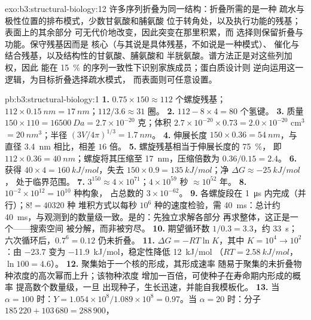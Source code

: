 \begin{solution}{exo:b3:structural-biology:12}
许多序列折叠为同一结构：折叠所需的是一种
疏水与极性位置的排布模式，少数甘氨酸和脯氨酸
位于转角处，以及执行功能的残基；表面上的其余部分
可无代价地改变，因此突变在那里积累，而
选择则保留折叠与功能。保守残基因而是
核心（与其说是具体残基，不如说是一种模式）、
催化与结合残基，以及结构性的甘氨酸、脯氨酸和
半胱氨酸。谱方法正是对这些列加权，因此
能在 \qty{15}{\%} 的序列一致性下识别家族成员；蛋白质设计则
逆向运用这一逻辑，为目标折叠选择疏水模式，
而表面则可任意设置。
\end{solution}

\begin{solution}{pb:b3:structural-biology:1}
\textbf{1.} $0.75\times 150 \approx 112$ 个螺旋残基；$112\times
\qty{0.15}{nm} = \qty{17}{nm}$；$112/3.6 \approx 31$ 圈。
\textbf{2.} $112 - 8\times 4 = 80$ 个氢键。
\textbf{3.} 质量 $150\times 110 = \qty{16500}{Da} = 2.7\times 10^{-20}$
克；体积 $2.7\times 10^{-20}\times 0.73 = 2.0\times 10^{-20}$ cm$^{3}$
$= \qty{20}{nm^3}$；半径 $(3V/4\pi)^{1/3} = \qty{1.7}{nm}$。
\textbf{4.} 伸展长度 $150\times 0.36 = \qty{54}{nm}$，与
直径 \qty{3.4}{nm} 相比，相差 $16$ 倍。
\textbf{5.} 螺旋残基相当于伸展长度的 \qty{75}{\%}，
即 $112\times 0.36 = \qty{40}{nm}$；螺旋将其压缩至
\qty{17}{nm}，压缩倍数为 $0.36/0.15 = 2.4$。
\textbf{6.} 获得 $40\times 4 = \qty{160}{kJ/mol}$，失去 $150\times 0.9 =
\qty{135}{kJ/mol}$；净 $\Delta G \approx \qty{-25}{kJ/mol}$，
处于临界范围。
\textbf{7.} $3^{150} \approx 4\times 10^{71}$；$4\times 10^{59}$ 秒
$\approx 10^{52}$ 年。
\textbf{8.} $10^{-2}\times 10^{12} = 10^{10}$ 种构象，
占总数的 $3\times 10^{-62}$。
\textbf{9.} 各螺旋段在 \qty{1}{\micro s} 内完成（并行）；$8! = \num{40320}$ 种
堆积方式以每秒 $10^{6}$ 种的速度检验，需 \qty{40}{ms}：总计约
\qty{40}{ms}，与观测到的数量级一致。是的：先独立求解各部分
再求整体，这正是一个——搜索空间
被分解，而非被穷尽。
\textbf{10.} 期望循环数 $1/0.3 = 3.3$，约 \qty{33}{s}；
六次循环后，$0.7^{6} = 0.12$ 仍未折叠。
\textbf{11.} $\Delta G = -RT\ln K$，其中 $K = 10^{4} \to 10^{2}$：由
$-23.7$ 变为 \qty{-11.9}{kJ/mol}，稳定性降低 \qty{12}{kJ/mol}
（$RT = \qty{2.58}{kJ/mol}$，$\ln 100 = 4.6$）。
\textbf{12.} 聚集始于一个核的形成，其形成速率
随易于聚集的未折叠物种浓度的高次幂而上升；该物种浓度
增加一百倍，可使种子在寿命期内形成的概率
提高数个数量级，一旦
出现种子，生长迅速，并能自我模板化。
\textbf{13.} 当 $\alpha = 100$ 时：$Y = 1.054\times 10^{8}/1.089\times 10^{8} =
0.97$。当 $\alpha = 20$ 时：分子 $185\,220 + 103\,680 = 288\,900$，

\end{solution}
